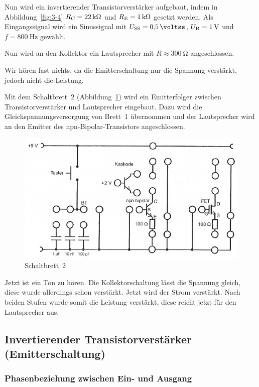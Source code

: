 Nun wird ein invertierender Transistorverstärker aufgebaut, indem in
Abbildung~\ref{fig:3-4} $\RC = \SI{22}{\kilo\ohm}$ und $\RE = \SI1{\kilo\ohm}$
gesetzt werden. Als Eingangssignal wird ein Sinussignal mit $U_\text{SS} = \SI
{0.5}{\voltss}$, $\UB = \SI1{\volt}$ und $f = \SI{800}{\hertz}$ gewählt.

Nun wird an den Kollektor ein Lautsprecher mit $R \approx \SI{300}{\ohm}$
angeschlossen. 

Wir hören fast nichts, da die Emitterschaltung nur die Spannung verstärkt,
jedoch nicht die Leistung.

Mit dem Schaltbrett~2 (Abbildung~\ref{fig:3-5}) wird ein Emitterfolger zwischen
Transistorverstärker und Lautsprecher eingebaut. Dazu wird die
Gleichspannungsversorgung von Brett~1 übernommen und der Lautsprecher wird an
den Emitter des npn-Bipolar-Transistors angeschlossen.

\begin{figure}
    \centering
    \includegraphics[width=\textwidth]{Anleitung/3-5.png}
    \caption{%
        Schaltbrett~2 \cite[Abbildung~3.5]{physik313-Anleitung}
    }
    \label{fig:3-5}
\end{figure}

Jetzt ist ein Ton zu hören. Die Kollektorschaltung lässt die Spannung gleich,
diese wurde allerdings schon verstärkt. Jetzt wird der Strom verstärkt. Nach
beiden Stufen wurde somit die Leistung verstärkt, diese reicht jetzt für den
Lautsprecher aus.

\FloatBarrier
\subsection{Invertierender Transistorverstärker (Emitterschaltung)}

\FloatBarrier
\subsubsection{Phasenbeziehung zwischen Ein- und Ausgang}

